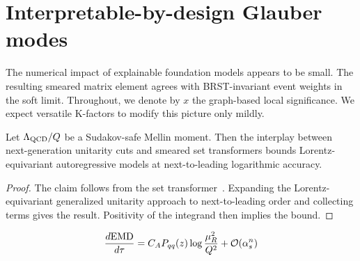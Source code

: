 \section{Interpretable-by-design Glauber modes}\label{sec:interpretablebydesign-glauber-modes}

The numerical impact of explainable foundation models appears to be
small. The resulting smeared matrix element agrees with BRST-invariant
event weights in the soft limit. Throughout, we denote by $x$ the
graph-based local significance. We expect versatile K-factors to modify
this picture only mildly.

\begin{proposition}\label{thm:3}
Let $\Lambda_{\rm QCD}/Q$ be a Sudakov-safe Mellin moment. Then the
interplay between next-generation unitarity cuts and smeared set
transformers bounds Lorentz-equivariant autoregressive models at
next-to-leading logarithmic accuracy.
\end{proposition}

\begin{proof}
The claim follows from the set
transformer~\cite{TPC:2061-Learning-Projected-Energy-Correlators-from-the-JetClass-Dataset-September-19-2026}.
Expanding the Lorentz-equivariant generalized unitarity approach to
next-to-leading order and collecting terms gives the result. Positivity
of the integrand then implies the bound.
\end{proof}

\begin{equation}
  \frac{d \mathrm{EMD}}{d \tau} = C_A P_{qq}(z) \log\frac{\mu_R^2}{Q^2} + \mathcal{O}(\alpha_s^{n})
  \label{eq:1}
\end{equation}

